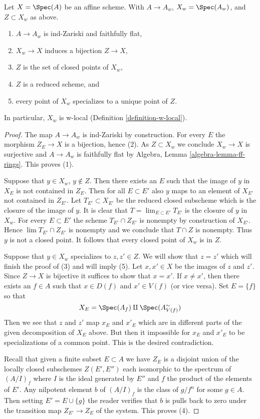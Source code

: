 \begin{lemma}
\label{lemma-make-w-local}
Let $X = \Spec(A)$ be an affine scheme. With $A \to A_w$, $X_w = \Spec(A_w)$,
and $Z \subset X_w$ as above.
\begin{enumerate}
\item $A \to A_w$ is ind-Zariski and faithfully flat,
\item $X_w \to X$ induces a bijection $Z \to X$,
\item $Z$ is the set of closed points of $X_w$,
\item $Z$ is a reduced scheme, and
\item every point of $X_w$ specializes to a unique point of $Z$.
\end{enumerate}
In particular, $X_w$ is w-local (Definition \ref{definition-w-local}).
\end{lemma}

\begin{proof}
The map $A \to A_w$ is ind-Zariski by construction.
For every $E$ the morphism $Z_E \to X$ is a bijection, hence (2).
As $Z \subset X_w$ we conclude $X_w \to X$ is surjective and
$A \to A_w$ is faithfully flat by
Algebra, Lemma \ref{algebra-lemma-ff-rings}. This proves (1).

\medskip\noindent
Suppose that $y \in X_w$, $y \not \in Z$. Then there
exists an $E$ such that the image of $y$ in $X_E$ is not contained in
$Z_E$. Then for all $E \subset E'$ also $y$ maps to an element of $X_{E'}$
not contained in $Z_{E'}$. Let $T_{E'} \subset X_{E'}$ be the reduced
closed subscheme which is the closure of the image of $y$. It is
clear that $T = \lim_{E \subset E'} T_{E'}$ is the closure of $y$ in $X_w$.
For every $E \subset E'$ the scheme $T_{E'} \cap Z_{E'}$ is nonempty
by construction of $X_{E'}$. Hence $\lim T_{E'} \cap Z_{E'}$ is nonempty
and we conclude that $T \cap Z$ is nonempty. Thus $y$ is not a closed point.
It follows that every closed point of $X_w$ is in $Z$.

\medskip\noindent
Suppose that $y \in X_w$ specializes to $z, z' \in Z$. We will show that
$z = z'$ which will finish the proof of (3) and will imply (5).
Let $x, x' \in X$ be the images of $z$ and $z'$. Since $Z \to X$ is
bijective it suffices to show that $x = x'$. If $x \not = x'$, then
there exists an $f \in A$ such that $x \in D(f)$ and $x' \in V(f)$
(or vice versa). Set $E = \{f\}$ so that
$$
X_E = \Spec(A_f) \amalg \Spec(A_{V(f)}^\sim)
$$
Then we see that $z$ and $z'$ map $x_E$ and $x'_E$ which are in different
parts of the given decomposition of $X_E$ above. But then it impossible
for $x_E$ and $x'_E$ to be specializations of a common point.
This is the desired contradiction.

\medskip\noindent
Recall that given a finite subset $E \subset A$ we have $Z_E$
is a disjoint union of the locally closed subschemes $Z(E', E'')$
each isomorphic to the spectrum of $(A/I)_f$ where $I$ is the ideal
generated by $E''$ and $f$ the product of the elements of $E'$.
Any nilpotent element $b$ of $(A/I)_f$ is the class of $g/f^n$
for some $g \in A$. Then setting $E' = E \cup \{g\}$ the reader
verifies that $b$ is pulls back to zero under the transition map
$Z_{E'} \to Z_E$ of the system. This proves (4).
\end{proof}

